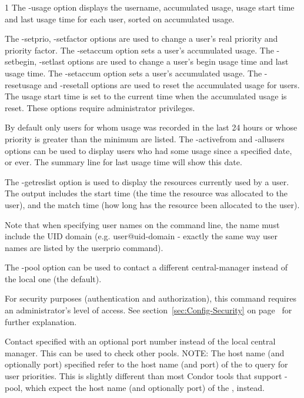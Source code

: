 \begin{ManPage}{\label{man-condor-userprio}}{1}
The -usage option displays the username, accumulated usage, usage start time and last usage time
for each user, sorted on accumulated usage.

The -setprio, -setfactor options are used to change a user's real priority and priority factor.
The -setaccum option sets a user's accumulated usage.
The -setbegin, -setlast options are used to change a user's begin usage time and last usage time.
The -setaccum option sets a user's accumulated usage.
The -resetusage and -resetall options are used to reset the accumulated usage for users. The
usage start time is set to the current time when the accumulated usage is reset. These
options require administrator privileges.

By default only users for whom usage was recorded in the last 24 hours or whose priority is
greater than the minimum are listed. The -activefrom and -allusers options can be used
to display users who had some usage since a specified date, or ever. The summary line for 
last usage time will show this date.

The -getreslist option is used to display the resources currently used by a user. The
output includes the start time (the time the resource was allocated to the user), and
the match time (how long has the resource been allocated to the user).

Note that when specifying user names on the command line, the name must include the
UID domain (e.g. user@uid-domain - exactly the same way user names are listed by the
userprio command).

The -pool option can be used to contact a different central-manager instead of
the local one (the default).

For security purposes (authentication and authorization),
this command requires an administrator's level of access.
See
section~\ref{sec:Config-Security} on page~\pageref{sec:Config-Security}
for further explanation.

\begin{Options}

	{Contact specified  with an
	optional port number instead of the local central
	manager. This can be used to check other pools.  NOTE: The
	host name (and optionally port) specified refer to the host name
	(and port) of the  to query for user
	priorities.  This is slightly different than most Condor tools
	that support -pool, which expect the host name (and optionally
	port) of the , instead.}


\end{Options}
\end{ManPage}
